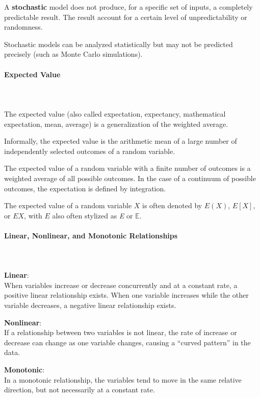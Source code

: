 \documentclass{article}
\begin{document}
A \textbf{stochastic} model does not produce, for a specific set of inputs, a completely predictable result. The result account for a certain level of unpredictability or randomness. 

Stochastic models can be analyzed statistically but may not be predicted precisely (such as Monte Carlo simulations).

\paragraph{Expected Value}\mbox{} \\ 
\mbox{} \\
The expected value (also called expectation, expectancy, mathematical expectation, mean, average) is a generalization of the weighted average. 

Informally, the expected value is the arithmetic mean of a large number of independently selected outcomes of a random variable.

The expected value of a random variable with a finite number of outcomes is a weighted average of all possible outcomes. In the case of a continuum of possible outcomes, the expectation is defined by integration.

The expected value of a random variable $X$ is often denoted by $E(X)$, $E[X]$, or $EX$, with $E$ also often stylized as \emph{E} or $\mathbb{E}$. 

\paragraph{Linear, Nonlinear, and Monotonic Relationships}\mbox{} \\ 
\mbox{} \\

\textbf{Linear}: \\ 
When variables increase or decrease concurrently and at a constant rate, a positive linear relationship exists.
When one variable increases while the other variable decreases, a negative linear relationship exists.

\textbf{Nonlinear}: \\
If a relationship between two variables is not linear, the rate of increase or decrease can change as one variable changes, causing a “curved pattern” in the data.

\textbf{Monotonic}: \\
In a monotonic relationship, the variables tend to move in the same relative direction, but not necessarily at a constant rate.
\end{document}
